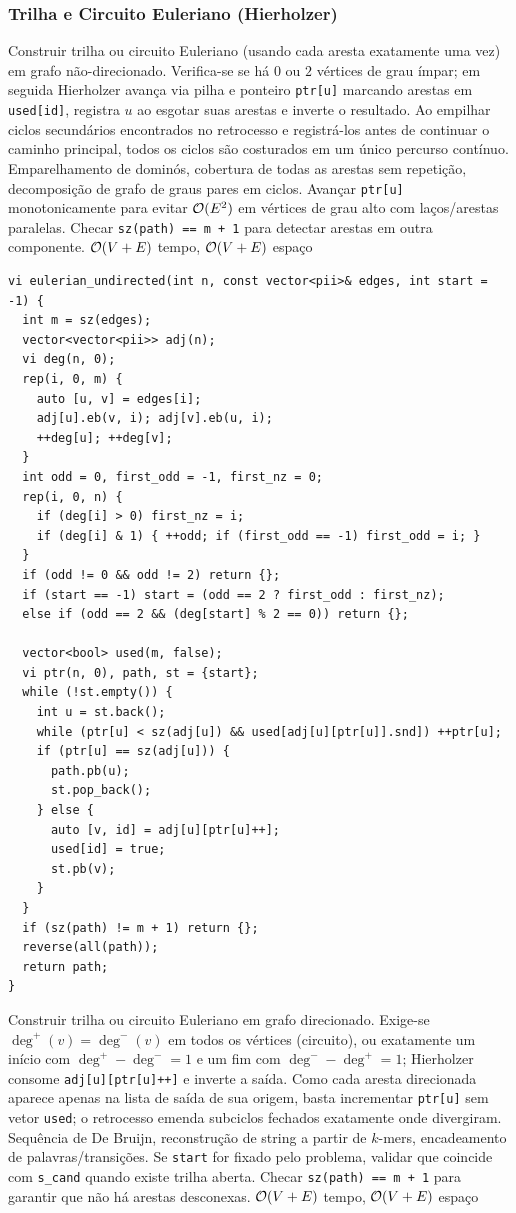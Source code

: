 \subsubsection{Trilha e Circuito Euleriano (Hierholzer)}
\algobox
  {Construir trilha ou circuito Euleriano (usando cada aresta exatamente uma vez) em grafo não-direcionado.}
  {Verifica-se se há $0$ ou $2$ vértices de grau ímpar; em seguida Hierholzer avança via pilha e ponteiro \texttt{ptr[u]} marcando arestas em \texttt{used[id]}, registra $u$ ao esgotar suas arestas e inverte o resultado.}
  {Ao empilhar ciclos secundários encontrados no retrocesso e registrá-los antes de continuar o caminho principal, todos os ciclos são costurados em um único percurso contínuo.}
  {Emparelhamento de dominós, cobertura de todas as arestas sem repetição, decomposição de grafo de graus pares em ciclos.}
  {Avançar \texttt{ptr[u]} monotonicamente para evitar $\mathcal{O}(E^2)$ em vértices de grau alto com laços/arestas paralelas. Checar \texttt{sz(path) == m + 1} para detectar arestas em outra componente.}
  {$\mathcal{O}(V + E)$ tempo, $\mathcal{O}(V + E)$ espaço}

\begin{lstlisting}
vi eulerian_undirected(int n, const vector<pii>& edges, int start = -1) {
  int m = sz(edges);
  vector<vector<pii>> adj(n);
  vi deg(n, 0);
  rep(i, 0, m) {
    auto [u, v] = edges[i];
    adj[u].eb(v, i); adj[v].eb(u, i);
    ++deg[u]; ++deg[v];
  }
  int odd = 0, first_odd = -1, first_nz = 0;
  rep(i, 0, n) {
    if (deg[i] > 0) first_nz = i;
    if (deg[i] & 1) { ++odd; if (first_odd == -1) first_odd = i; }
  }
  if (odd != 0 && odd != 2) return {};
  if (start == -1) start = (odd == 2 ? first_odd : first_nz);
  else if (odd == 2 && (deg[start] % 2 == 0)) return {};

  vector<bool> used(m, false);
  vi ptr(n, 0), path, st = {start};
  while (!st.empty()) {
    int u = st.back();
    while (ptr[u] < sz(adj[u]) && used[adj[u][ptr[u]].snd]) ++ptr[u];
    if (ptr[u] == sz(adj[u])) {
      path.pb(u);
      st.pop_back();
    } else {
      auto [v, id] = adj[u][ptr[u]++];
      used[id] = true;
      st.pb(v);
    }
  }
  if (sz(path) != m + 1) return {};
  reverse(all(path));
  return path;
}
\end{lstlisting}

\algobox
  {Construir trilha ou circuito Euleriano em grafo direcionado.}
  {Exige-se $\deg^+(v) = \deg^-(v)$ em todos os vértices (circuito), ou exatamente um início com $\deg^+ - \deg^- = 1$ e um fim com $\deg^- - \deg^+ = 1$; Hierholzer consome \texttt{adj[u][ptr[u]++]} e inverte a saída.}
  {Como cada aresta direcionada aparece apenas na lista de saída de sua origem, basta incrementar \texttt{ptr[u]} sem vetor \texttt{used}; o retrocesso emenda subciclos fechados exatamente onde divergiram.}
  {Sequência de De Bruijn, reconstrução de string a partir de $k$-mers, encadeamento de palavras/transições.}
  {Se \texttt{start} for fixado pelo problema, validar que coincide com \texttt{s\_cand} quando existe trilha aberta. Checar \texttt{sz(path) == m + 1} para garantir que não há arestas desconexas.}
  {$\mathcal{O}(V + E)$ tempo, $\mathcal{O}(V + E)$ espaço}

